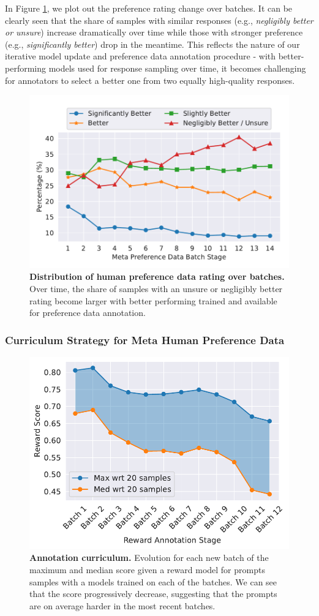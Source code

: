 In Figure \ref{fig:rm_data_rating}, we plot out the preference rating change over batches. It can be clearly seen that the share of samples with similar responses (e.g., \emph{negligibly better or unsure}) increase dramatically over time while those with stronger preference (e.g., \emph{significantly better}) drop in the meantime. This reflects the nature of our iterative model update and preference data annotation procedure - with better-performing \modelname models used for response sampling over time, it becomes challenging for annotators to select a better one from two equally high-quality responses. 

\begin{figure}
    \centering
    \includegraphics[width=0.7 \linewidth]{img/rm/pref_data_rating_trend_merged.pdf}
    \caption{\textbf{Distribution of human preference data rating over batches.} 
    Over time, the share of samples with an unsure or negligibly better rating become larger with better performing \modelname trained and available for preference data annotation.}
    \label{fig:rm_data_rating}
\end{figure}

\subsubsection{Curriculum Strategy for Meta Human Preference Data}
\begin{figure}[b!]
    \centering    \includegraphics[width=0.5 \linewidth]{img/curiculum_annotation.pdf}
    \caption{\textbf{Annotation curriculum.} Evolution for each new batch of the maximum and median score given a reward model for prompts samples with a models trained on each of the batches. We can see that the score progressively decrease, suggesting that the prompts are on average harder in the most recent batches. }
    \label{fig:curiculum_annotation}
\end{figure}


